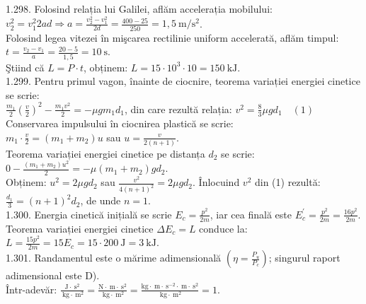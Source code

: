 1.298. Folosind relația lui Galilei, aflăm accelerația mobilului:\\ $v_{2}^{2}=v_{1}^{2} 2 a d \Rightarrow a=\frac{v_{2}^{2}-v_{1}^{2}}{2 d}=\frac{400-25}{250}=1,5 \mathrm{~m} / \mathrm{s}^{2}$.\\ Folosind legea vitezei în mişcarea rectilinie uniform accelerată, aflăm timpul:\\ $t=\frac{v_{2}-v_{1}}{a}=\frac{20-5}{1,5}=10 \mathrm{~s}$.\\ Ştiind că $L=P \cdot t$, obținem: $L=15 \cdot 10^{3} \cdot 10=150 \mathrm{~kJ}$.\\

1.299. Pentru primul vagon, înainte de ciocnire, teorema variației energiei cinetice se scrie:\\ $\frac{m_{1}}{2}\left(\frac{v}{2}\right)^{2}-\frac{m_{1} v^{2}}{2}=-\mu g m_{1} d_{1}$, din care rezultă relația: $v^{2}=\frac{8}{3} \mu g d_{1} \quad (1)$\\ Conservarea impulsului în ciocnirea plastică se scrie:\\ $m_{1} \cdot \frac{v}{2}=\left(m_{1}+m_{2}\right) u$ sau $u=\frac{v}{2(n+1)}$.\\ Teorema variației energiei cinetice pe distanța $d_{2}$ se scrie:\\ $0-\frac{\left(m_{1}+m_{2}\right) u^{2}}{2}=-\mu\left(m_{1}+m_{2}\right) g d_{2}$.\\ Obținem: $u^{2}=2 \mu g d_{2}$ sau $\frac{v^{2}}{4(n+1)^{2}}=2 \mu g d_{2}$. Înlocuind $v^{2}$ din (1) rezultă:\\ $\frac{d_{1}}{3}=(n+1)^{2} d_{2}$, de unde $n=1$.\\

1.300. Energia cinetică inițială se scrie $E_{c}=\frac{p^{2}}{2 m}$, iar cea finală este $E_{c}^{\prime}=\frac{p^{2}}{2 m}=\frac{16 p^{2}}{2 m}$. Teorema variației energiei cinetice $\Delta E_{c}=L$ conduce la:\\ $L=\frac{15 p^{2}}{2 m}=15 E_{c}=15 \cdot 200 \mathrm{~J}=3 \mathrm{~kJ}$.\\

1.301. Randamentul este o mărime adimensională $\left(\eta=\frac{P_{u}}{P_{c}}\right)$; singurul raport adimensional este D).\\ Într-adevăr: $\frac{\mathrm{J} \cdot \mathrm{~s}^{2}}{\mathrm{~kg} \cdot \mathrm{~m}^{2}}=\frac{\mathrm{N} \cdot \mathrm{~m} \cdot \mathrm{~s}^{2}}{\mathrm{~kg} \cdot \mathrm{~m}^{2}}=\frac{\mathrm{kg} \cdot \mathrm{~m} \cdot \mathrm{~s}^{-2} \cdot \mathrm{~m} \cdot \mathrm{~s}^{2}}{\mathrm{~kg} \cdot \mathrm{~m}^{2}}=1$.\\

